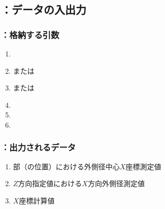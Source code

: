 \subsection{\MXOThickness：データの入出力}

\subsubsection{\MXOThickness：格納する引数}
\begin{enumerate}[label*=\sarrow]
\item \PMACOD
\item \PMTopReAlocationLength または\PMBottomReAlocationLength
\item \PMTopAlocationLength または\PMBottomAlocationLength
\item \PMCenterCurvatureRadius
\item \PMKeywayPos
\item \PMKeywayWidth
\end{enumerate}

\subsubsection{\MXOThickness：出力されるデータ}
\begin{enumerate}[label*=\sarrow]
\item \EndFace 部（\ReAlocationLength の位置）における外側径中心$X$座標測定値
\item $Z$方向指定値における$X$方向外側径測定値
\item \KeywayCenter$X$座標計算値
\end{enumerate}

